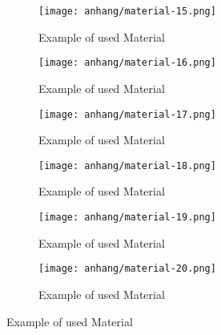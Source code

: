 	
	
	\begin{figure}[h]
		\centering
		\begin{subfigure}{0.45\textwidth}
			\centering
			\texttt{[image: anhang/material-15.png]}
			\caption[Example of used Material, created by \cite{Quixel}]{Example of used Material}
		\end{subfigure}
		\begin{subfigure}{0.45\textwidth}
			\centering
			\texttt{[image: anhang/material-16.png]}
			\caption[Example of used Material, created by \cite{Quixel}]{Example of used Material}
		\end{subfigure}
		
		\begin{subfigure}{0.45\textwidth}
			\centering
			\texttt{[image: anhang/material-17.png]}
			\caption[Example of used Material, created by \cite{Quixel}]{Example of used Material}
		\end{subfigure}
		\begin{subfigure}{0.45\textwidth}
			\centering
			\texttt{[image: anhang/material-18.png]}
			\caption[Example of used Material, created by \cite{Quixel}]{Example of used Material}
		\end{subfigure}
		
		\begin{subfigure}{0.45\textwidth}
			\centering
			\texttt{[image: anhang/material-19.png]}
			\caption[Example of used Material, created by \cite{Quixel}]{Example of used Material}
		\end{subfigure}
		\begin{subfigure}{0.45\textwidth}
			\centering
			\texttt{[image: anhang/material-20.png]}
			\caption[Example of used Material, created by \cite{Quixel}]{Example of used Material}
		\end{subfigure}
	\end{figure}

